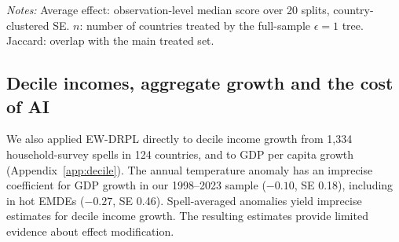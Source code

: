 \begin{table}[t]
\centering
\caption{Sensitivity analysis}\label{tab:sens}
\small
{}
\begin{minipage}{0.95\textwidth}\footnotesize\smallskip
\emph{Notes:} Average effect: observation-level median score over 20 splits, country-clustered SE.
$n$: number of countries treated by the full-sample $\epsilon=1$ tree. Jaccard: overlap with the
main treated set.
\end{minipage}
\end{table}

\subsection{Decile incomes, aggregate growth and the cost of AI}\label{sec:res_decile}

We also applied EW-DRPL directly to decile income growth from 1,334 household-survey spells in 124
countries, and to GDP per capita growth (Appendix~\ref{app:decile}). The annual temperature anomaly has an imprecise coefficient for GDP growth in our
1998--2023 sample ($-0.10$, SE 0.18), including in hot EMDEs ($-0.27$, SE 0.46).
Spell-averaged anomalies yield imprecise estimates for decile income growth. The
resulting estimates provide limited evidence about effect modification.

